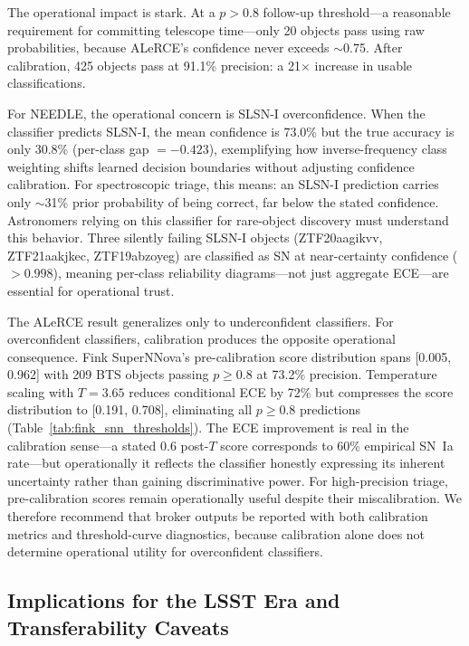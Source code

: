 \documentclass[twocolumn]{aastex631}
\begin{document}
The operational impact is stark. At a $p > 0.8$ follow-up threshold---a reasonable requirement for committing telescope time---only 20 objects pass using raw probabilities, because ALeRCE's confidence never exceeds $\sim$0.75. After calibration, 425 objects pass at 91.1\% precision: a 21$\times$ increase in usable classifications.

For NEEDLE, the operational concern is SLSN-I overconfidence. When the classifier predicts SLSN-I, the mean confidence is 73.0\% but the true accuracy is only 30.8\% (per-class gap $= -0.423$), exemplifying how inverse-frequency class weighting shifts learned decision boundaries without adjusting confidence calibration. For spectroscopic triage, this means: an SLSN-I prediction carries only $\sim$31\% prior probability of being correct, far below the stated confidence. Astronomers relying on this classifier for rare-object discovery must understand this behavior. Three silently failing SLSN-I objects (ZTF20aagikvv, ZTF21aakjkec, ZTF19abzoyeg) are classified as SN at near-certainty confidence ($> 0.998$), meaning per-class reliability diagrams---not just aggregate ECE---are essential for operational trust.

\label{sec:implications}The ALeRCE result generalizes only to underconfident classifiers. For overconfident classifiers, calibration produces the opposite operational consequence. Fink SuperNNova's pre-calibration score distribution spans [0.005, 0.962] with 209 BTS objects passing $p \ge 0.8$ at 73.2\% precision. Temperature scaling with $T = 3.65$ reduces conditional ECE by 72\% but compresses the score distribution to [0.191, 0.708], eliminating all $p \ge 0.8$ predictions (Table~\ref{tab:fink_snn_thresholds}). The ECE improvement is real in the calibration sense---a stated 0.6 post-$T$ score corresponds to 60\% empirical SN~Ia rate---but operationally it reflects the classifier honestly expressing its inherent uncertainty rather than gaining discriminative power. For high-precision triage, pre-calibration scores remain operationally useful despite their miscalibration. We therefore recommend that broker outputs be reported with both calibration metrics and threshold-curve diagnostics, because calibration alone does not determine operational utility for overconfident classifiers.

\subsection{Implications for the LSST Era and Transferability Caveats}
\label{sec:lsst_implications}
\end{document}
